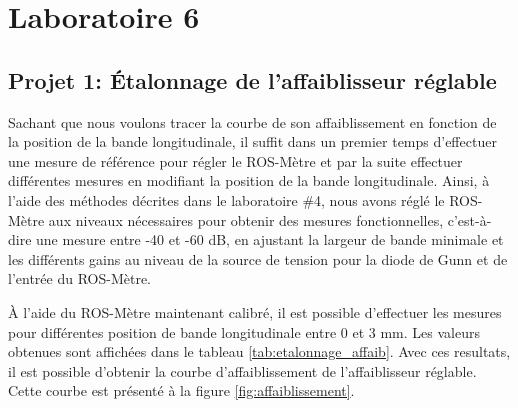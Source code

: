 



\label{s:experimentation}
\chapter{Laboratoire 6}
\section{Projet 1: Étalonnage de l'affaiblisseur réglable}
Sachant que nous voulons tracer la courbe de son affaiblissement en fonction de la position de la bande longitudinale, il suffit dans un premier temps d'effectuer une mesure de référence pour régler le ROS-Mètre et par la suite effectuer différentes mesures en modifiant la position de la bande longitudinale. 
Ainsi, à l'aide des méthodes décrites dans le laboratoire \#4, nous avons réglé le ROS-Mètre aux niveaux nécessaires pour obtenir des mesures fonctionnelles, c'est-à-dire une mesure entre -40 et -60 dB, en ajustant la largeur de bande minimale et les différents gains au niveau de la source de tension pour la diode de Gunn et de l'entrée du ROS-Mètre. 

À l'aide du ROS-Mètre maintenant calibré, il est possible d'effectuer les mesures pour différentes position de bande longitudinale entre 0 et 3 mm. Les valeurs obtenues sont affichées dans le tableau \ref{tab:etalonnage_affaib}. Avec ces resultats, il est possible d'obtenir la courbe d'affaiblissement de l'affaiblisseur réglable. Cette courbe est présenté à la figure \ref{fig:affaiblissement}.

